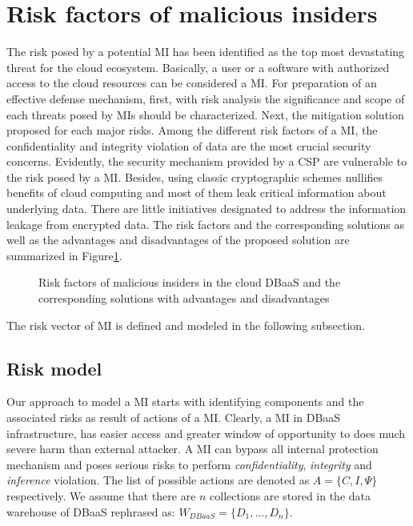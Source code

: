 \section{Risk factors of malicious insiders}
\label{sec:riskMeasures}
The risk posed by a potential MI has been identified as the top most devastating threat for the cloud ecosystem. Basically, a user or a software with authorized access to the cloud resources can be considered a MI. For preparation of an effective defense mechanism, first, with risk analysis the significance and scope of each threats posed by MIs should be characterized. Next, the mitigation solution proposed for each major risks. Among the different risk factors of a MI, the confidentiality and integrity violation of data are the most crucial security concerns. Evidently, the security mechanism provided by a CSP are vulnerable to the risk posed by a MI. Besides, using classic cryptographic schemes nullifies benefits of cloud computing and most of them leak critical information about underlying data. There are little initiatives designated to address the information leakage from encrypted data. The risk factors and the corresponding solutions as well as the advantages and disadvantages of the proposed solution are summarized in Figure\ref{fig:MIriskFactors}.

\begin{figure}[H]
\centering
\resizebox{0.9\textwidth}{!}{}
\caption{Risk factors of malicious insiders in the cloud DBaaS and the corresponding solutions with advantages and disadvantages}
\label{fig:MIriskFactors}
\end{figure}

The risk vector of MI is defined and modeled in the following subsection.

\subsection{Risk model}
\label{MaliciousInsiderModelSubSec}
Our approach to model a MI starts with identifying components and the associated risks as result of actions of a MI. Clearly, a MI in DBaaS infrastructure, has easier access and greater window of opportunity to does much severe harm than external attacker. A MI can bypass all internal protection mechanism and poses serious risks to perform \textit{confidentiality}, \textit{integrity} and \textit{inference} violation. The list of possible actions are denoted as $A=\{C, I,\Psi \}$ respectively. We assume that there are $n$ collections are stored in the data warehouse of DBaaS rephrased as: $W_{DBaaS}= \{D_1,\dots,D_n\}$.\\


